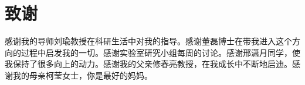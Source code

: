 
\chapter{致谢}
感谢我的导师刘瑜教授在科研生活中对我的指导。感谢董磊博士在带我进入这个方向的过程中启发我的一切。感谢实验室研究小组每周的讨论。感谢邢潇月同学，使我保持了很多向上的动力。感谢我的父亲修春亮教授，在我成长中不断地启迪。感谢我的母亲柯莹女士，你是最好的妈妈。
